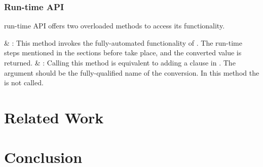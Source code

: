 \subsubsection{Run-time API}
\zamk run-time API offers two overloaded methods to access its functionality.

\begin{easylist}[itemize]
&  : This method invokes the fully-automated functionality of \zamk. 
The run-time steps mentioned in the sections before take place, and the converted value is returned.
&  : Calling this method is equivalent to adding a  clause in \gluer. 
The  argument should be the fully-qualified name of the conversion. 
In this method the  is not called.
\end{easylist}

\section{Related Work}
\section{Conclusion}

